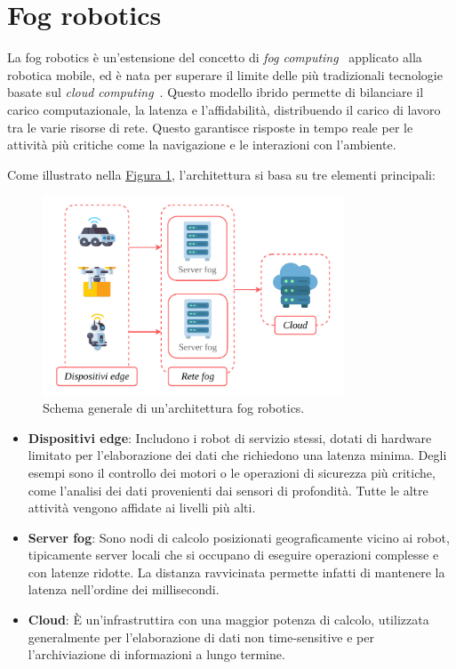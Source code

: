 \documentclass[12pt]{report}
\begin{document}
\section{Fog robotics}
\label{sec:fog_robotics}

La fog robotics è un'estensione del concetto di \textit{fog computing}~\cite{10.1145/2757384.2757397} applicato alla robotica mobile, ed è nata per superare il limite delle più tradizionali tecnologie basate sul \textit{cloud computing}~\cite{qian2009cloud}. Questo modello ibrido permette di bilanciare il carico computazionale, la latenza e l'affidabilità, distribuendo il carico di lavoro tra le varie risorse di rete. Questo garantisce risposte in tempo reale per le attività più critiche come la navigazione e le interazioni con l'ambiente.

Come illustrato nella \hyperref[fig:fog_robotics]{Figura \ref{fig:fog_robotics}}, l'architettura si basa su tre elementi principali:


\begin{figure}[t]
	\centering
	\includegraphics[width=0.8\textwidth, clip]{images/fog-robotics}
	\caption{Schema generale di un'architettura fog robotics.}
	\label{fig:fog_robotics}
\end{figure}

\begin{itemize}
	\item \textbf{Dispositivi edge}: Includono i robot di servizio stessi, dotati di hardware limitato per l'elaborazione dei dati che richiedono una latenza minima. Degli esempi sono il controllo dei motori o le operazioni di sicurezza più critiche, come l'analisi dei dati provenienti dai sensori di profondità. Tutte le altre attività vengono affidate ai livelli più alti.
	
	\item \textbf{Server fog}: Sono nodi di calcolo posizionati geograficamente vicino ai robot, tipicamente server locali che si occupano di eseguire operazioni complesse e con latenze ridotte. La distanza ravvicinata permette infatti di mantenere la latenza nell'ordine dei millisecondi.
	
	\item \textbf{Cloud}: È un'infrastruttira con una maggior potenza di calcolo, utilizzata generalmente per l'elaborazione di dati non time-sensitive e per l'archiviazione di informazioni a lungo termine.
\end{itemize}
\end{document}
